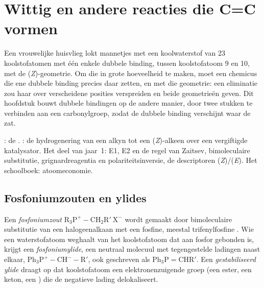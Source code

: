 \chapter{Wittig en andere reacties die C=C vormen}\label{ch:b2:wittig}

Een vrouwelijke huisvlieg lokt mannetjes met een koolwaterstof van 23 koolstofatomen met één enkele dubbele binding, tussen
koolstofatoom 9 en 10, met de (\textit{Z})-geometrie. Om die in grote hoeveelheid te maken, moet een chemicus die ene
dubbele binding precies daar zetten, en met die geometrie: een eliminatie zou haar over verscheidene
posities verspreiden en beide geometrieën geven. Dit hoofdstuk bouwt dubbele bindingen op de andere manier, door twee
stukken te verbinden aan een carbonylgroep, zodat de dubbele binding verschijnt waar de  zat.

\begin{recall}
: de . : de hydrogenering van
een alkyn tot een (\textit{Z})-alkeen over een vergiftigde katalysator. Het deel van jaar~1: E1, E2 en de regel van
Zaitsev, bimoleculaire substitutie, grignardreagentia en polariteitsinversie, de
descriptoren (\textit{Z})/(\textit{E}). Het schoolboek: atoomeconomie.
\end{recall}

\section{Fosfoniumzouten en ylides}

\begin{definition}[Fosfoniumylides]\label{def:b2:wittig:ylide}
Een \emph{fosfoniumzout} $\mathrm{R_3P^+{-}CH_2R'\ X^-}$ wordt gemaakt door bimoleculaire
substitutie van een halogeenalkaan met een fosfine, meestal trifenylfosfine . Wie een
waterstofatoom weghaalt van het koolstofatoom dat aan fosfor gebonden is, krijgt een \emph{fosfoniumylide},
een neutraal molecuul met tegengestelde ladingen naast elkaar, $\mathrm{Ph_3P^+{-}CH^-{-}R'}$, ook geschreven als $\mathrm{Ph_3P{=}CHR'}$. Een
\emph{gestabiliseerd ylide} draagt op dat koolstofatoom een elektronenzuigende groep
(een ester, een keton, een ) die de negatieve lading delokaliseert.
\end{definition}

